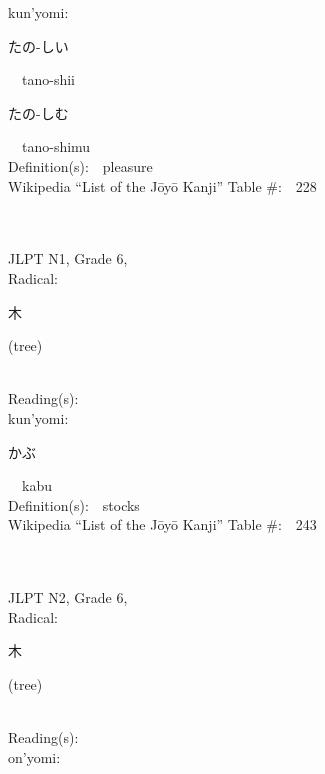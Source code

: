 \begin{multicols}{2}
{\hspace*{1em}}kun'yomi:\ \ \\
{\hspace*{2em}}{\begin{CJK}{UTF8}{min} たの-しい \end{CJK}}\ \ tano-shii\ \ \\
{\hspace*{2em}}{\begin{CJK}{UTF8}{min} たの-しむ \end{CJK}}\ \ tano-shimu\ \ \\
Definition(s):\ \ pleasure \\
Wikipedia ``List of the J\=oy\=o Kanji'' Table \#:\ \ 228 \\
\ \ \\
{\fontsize{34pt}{40pt}  }\ \ \\  %
{JLPT N1, Grade 6, \\Radical:\ \ {\begin{CJK}{UTF8}{min} 木 \end{CJK}} (tree) } \\
Reading(s):\ \ \\
{\hspace*{1em}}kun'yomi:\ \ \\
{\hspace*{2em}}{\begin{CJK}{UTF8}{min} かぶ \end{CJK}}\ \ kabu\ \ \\
Definition(s):\ \ stocks \\
Wikipedia ``List of the J\=oy\=o Kanji'' Table \#:\ \ 243 \\
\ \ \\
{\fontsize{34pt}{40pt}  }\ \ \\  %
{JLPT N2, Grade 6, \\Radical:\ \ {\begin{CJK}{UTF8}{min} 木 \end{CJK}} (tree) } \\
Reading(s):\ \ \\
{\hspace*{1em}}on'yomi:\ \ \\

\end{multicols}
